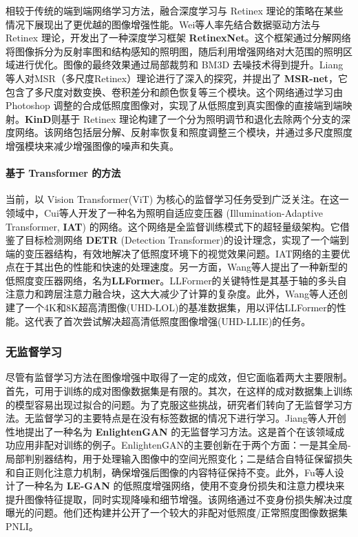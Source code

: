 \documentclass[a4paper]{ctexart}
\begin{document}
	相较于传统的端到端网络学习方法，融合深度学习与 Retinex 理论的策略在某些情况下展现出了更优越的图像增强性能。Wei等人\cite{wei2018deep}率先结合数据驱动方法与 Retinex 理论，开发出了一种深度学习框架 \textbf{RetinexNet}。这个框架通过分解网络将图像拆分为反射率图和结构感知的照明图，随后利用增强网络对大范围的照明区域进行优化。图像的最终效果通过局部裁剪和 BM3D 去噪技术得到提升。Liang等人\cite{shen2017msr}对MSR（多尺度Retinex）理论进行了深入的探究，并提出了 \textbf{MSR-net}，它包含了多尺度对数变换、卷积差分和颜色恢复等三个模块。这个网络通过学习由 Photoshop 调整的合成低照度图像对，实现了从低照度到真实图像的直接端到端映射。\textbf{KinD}\cite{zhang2019kindling}则基于 Retinex 理论构建了一个分为照明调节和退化去除两个分支的深度网络。该网络包括层分解、反射率恢复和照度调整三个模块，并通过多尺度照度增强模块来减少增强图像的噪声和失真。
	
	\paragraph{基于 Transformer 的方法}
	
	当前，以 Vision Transformer(ViT) 为核心的监督学习任务受到广泛关注。在这一领域中，Cui等人\cite{cui2022illumination}开发了一种名为照明自适应变压器 (Illumination-Adaptive Transformer, \textbf{IAT}) 的网络。这个网络是全监督训练模式下的超轻量级架构。它借鉴了目标检测网络 \textbf{DETR} (Detection Transformer)的设计理念\cite{carion2020end}，实现了一个端到端的变压器结构，有效地解决了低照度环境下的视觉效果问题。IAT网络的主要优点在于其出色的性能和快速的处理速度。另一方面，Wang等人\cite{wang2023ultra}提出了一种新型的低照度变压器网络，名为\textbf{LLFormer}。LLFormer的关键特性是其基于轴的多头自注意力和跨层注意力融合块，这大大减少了计算的复杂度。此外，Wang等人还创建了一个4K和8K超高清图像(UHD-LOL)的基准数据集，用以评估LLFormer的性能。这代表了首次尝试解决超高清低照度图像增强(UHD-LLIE)的任务。
	
	\subsubsection{无监督学习}
	
	尽管有监督学习方法在图像增强中取得了一定的成效，但它面临着两大主要限制。首先，可用于训练的成对图像数据集是有限的。其次，在这样的成对数据集上训练的模型容易出现过拟合的问题。为了克服这些挑战，研究者们转向了无监督学习方法。无监督学习的主要特点是在没有标签数据的情况下进行学习。Jiang等人\cite{jiang2021enlightengan}开创性地提出了一种名为 \textbf{EnlightenGAN} 的无监督学习方法。这是首个在该领域成功应用非配对训练的例子。EnlightenGAN的主要创新在于两个方面：一是其全局-局部判别器结构，用于处理输入图像中的空间光照变化；二是结合自特征保留损失和自正则化注意力机制，确保增强后图像的内容特征保持不变。此外，Fu等人\cite{fu2022gan}设计了一种名为 \textbf{LE-GAN} 的低照度增强网络，使用不变身份损失和注意力模块来提升图像特征提取，同时实现降噪和细节增强。该网络通过不变身份损失解决过度曝光的问题。他们还构建并公开了一个较大的非配对低照度/正常照度图像数据集PNLI。
	
\end{document}
